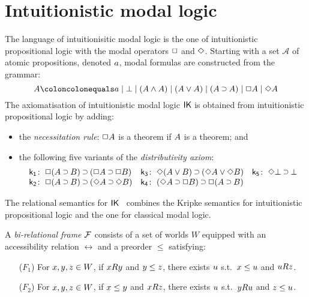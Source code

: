 \documentclass[twoside]{aiml20}
\begin{document}
\section{Intuitionistic modal logic}
The language of {intuitionisitic modal logic} is the one of intuitionistic propositional logic with the modal operators $\mathord{\Box}$ and $\mathord{\Diamond}$. %
%
Starting with a set $\mathcal{A}$ of atomic propositions, denoted $a$, modal formulas are constructed from the grammar:
%
$$
\fm A \coloncolonequals
\fm a \mid \fm{\BOT} \mid \fm{(A \AND A)} \mid \fm{(A \OR A)} \mid \fm{(A \IMP A)} \mid \fm{\BOX A} \mid \fm{\DIA A}
$$
%
The axiomatisation of intuitionistic modal logic $\mathsf{IK}$ \cite{plotkin1986,fischer1984}
%
is obtained from intuitionistic propositional logic by adding:
\begin{itemize}
	\item the \emph{necessitation rule}: $\mathord{\Box} A$ is a theorem if $A$ is a theorem; and
	\item the following five variants of the \emph{distributivity axiom}:
	\begin{equation*}
	\label{eq:ik}%
	\begin{array}[t]{r@{\;}l@{\quad}r@{\;}l@{\quad}r@{\;}l}
	\kax[1]\colon&\fm{\BOX(A\IMP B)\IMP(\BOX A\IMP\BOX B)}
	&
	\kax[3]\colon&\fm{\DIA(A\OR B)\IMP(\DIA A\OR\DIA B)}
	&
	\kax[5]\colon&\fm{\DIA\BOT\IMP\BOT}
	\\
	\kax[2]\colon&\fm{\BOX(A\IMP B)\IMP(\DIA A\IMP\DIA B)}
	&
	\kax[4]\colon&\fm{(\DIA A\IMP \BOX B)\IMP\BOX(A\IMP B)}\\%
	\end{array}
	\end{equation*}
\end{itemize}

The relational semantics for $\mathsf{IK}$~\cite{fischer1984} combines the Kripke semantics for intuitionistic propositional logic and the one for classical modal logic. %


\begin{definition}
	A \emph{bi-relational frame} $\mathcal{F}$ consists %
	of a set of worlds $W$ equipped with an {accessibility relation} $\rel$ and a preorder $\le$ satisfying:
	\begin{enumerate}
		\item[($F_1$)] For $x, y, z \in W$, if $xRy$ and $y\le{z}$, there exists $u$ s.t.~$x\le{u}$ and $uRz$.
		
		\item[($F_2$)] For $x, y, z \in W$, if $x\le{y}$ and $xRz$, there exists $u$ s.t.~$yRu$ and $z\le{u}$.
	\end{enumerate}
\end{definition}
\end{document}
